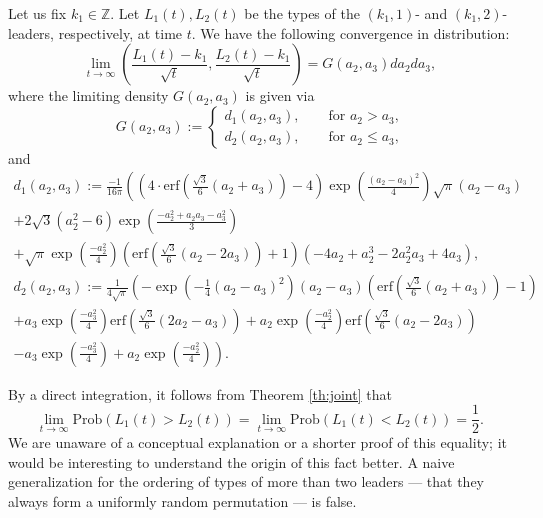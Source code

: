 \documentclass[10pt,a4paper]{amsart}
\def\Z{\mathbb Z}
\renewcommand\le{\leq}
\begin{document}
	\begin{thm}
		\label{th:joint}
		Let us fix $k_1 \in \Z$. Let $L_1 (t), L_2 (t) $ be the types of the $(k_1,1)$- and $(k_1,2)$-leaders, respectively, at time $t$. We have the following convergence in distribution:
		\begin{equation}
			\lim_{t \to \infty} \left( \frac{L_1(t) - k_1}{\sqrt{t}}, \frac{L_2(t) - k_1}{\sqrt{t}} \right) = G (a_2, a_3) d a_2 d a_3,
		\end{equation}
		where the limiting density $G (a_2, a_3)$ is given via
		$$
		G (a_2, a_3) :=
		\begin{cases}
			d_1 (a_2, a_3), \qquad \mbox{for $a_2 > a_3$,} \\
			d_2 (a_2,a_3), \qquad \mbox{for $a_2 \le a_3$,}
		\end{cases}
		$$
		and
		\begin{multline}
			\label{eq:density2a}
			d_1 (a_2,a_3) :=
			\frac{-1}{16 \pi} \left( \left( 4 \cdot \mathrm{erf} \left( \frac{\sqrt{3}}{6} (a_2 +a_3) \right) -4 \right) \exp \left( \frac{(a_2-a_3)^2}{4} \right) \sqrt{\pi} (a_2 - a_3)
			\right. \\ \left. + 2 \sqrt{3} \left( a_2^2 -6 \right) \exp \left( \frac{-a_2^2+a_2 a_3 - a_3^2}{3} \right)
			\right. \\ \left. + \sqrt{\pi} \exp \left( \frac{-a_2^2}{4} \right) \left(  \mathrm{erf} \left( \frac{\sqrt{3}}{6} (a_2 - 2 a_3) \right) +1 \right) \left( - 4 a_2 +a_2^3 - 2 a_2^2 a_3 + 4 a_3 \right) \right. ,
		\end{multline}
		\begin{multline*}
			d_2 (a_2,a_3) := \frac{1}{4 \sqrt{\pi}} \left( - \exp \left( -\frac14 (a_2-a_3)^2 \right) (a_2 - a_3) \left( \mathrm{erf} \left( \frac{\sqrt{3}}{6} (a_2+a_3) \right) -1 \right)
			\right. \\ \left. + a_3 \exp \left( \frac{-a_3^2}{4} \right) \mathrm{erf} \left( \frac{\sqrt{3}}{6} (2 a_2-a_3) \right) +a_2 \exp \left( \frac{-a_2^2}{4} \right) \mathrm{erf} \left( \frac{\sqrt{3}}{6} ( a_2- 2 a_3) \right)
			\right. \\ \left. - a_3 \exp \left( \frac{-a_3^2}{4} \right) + a_2 \exp \left( \frac{-a_2^2}{4} \right) \right).
		\end{multline*}
		
	\end{thm}

	\begin{rmk}
		\label{rem:permut}
		By a direct integration, it follows from Theorem \ref{th:joint} that
		$$
		\lim_{t \to \infty} \mathrm{Prob} \left( L_1(t) > L_2 (t) \right) = 
		\lim_{t \to \infty} \mathrm{Prob} \left( L_1(t) < L_2 (t) \right) = \frac12. 
		$$
		We are unaware of a conceptual explanation or a shorter proof of this equality; it would be interesting to understand the origin of this fact better. A naive generalization for the ordering of types of more than two leaders --- that they always form a uniformly random permutation --- is false. 
	\end{rmk}
\end{document}
